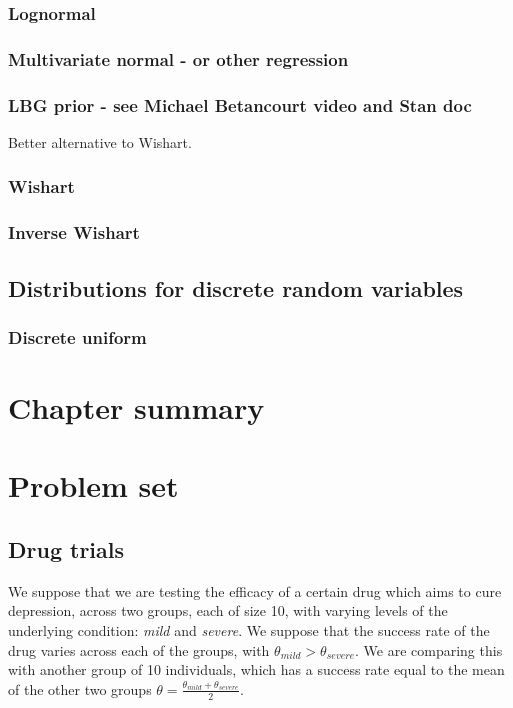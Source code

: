 \documentclass[11pt,fullpage]{book}
\begin{document}
\subsubsection{Lognormal}

\subsubsection{Multivariate normal - or other regression}
\subsubsection{LBG prior - see Michael Betancourt video and Stan doc}
Better alternative to Wishart.
\subsubsection{Wishart}
\subsubsection{Inverse Wishart}

\subsection{Distributions for discrete random variables}
\subsubsection{Discrete uniform}

\section{Chapter summary}
\section{Problem set}
\subsection{Drug trials}
We suppose that we are testing the efficacy of a certain drug which aims to cure depression, across two groups, each of size 10, with varying levels of the underlying condition: \textit{mild} and \textit{severe}. We suppose that the success rate of the drug varies across each of the groups, with $\theta_{mild}>\theta_{severe}$. We are comparing this with another group of 10 individuals, which has a success rate equal to the mean of the other two groups $\theta = \frac{\theta_{mild}+\theta_{severe}}{2}$.
\end{document}

